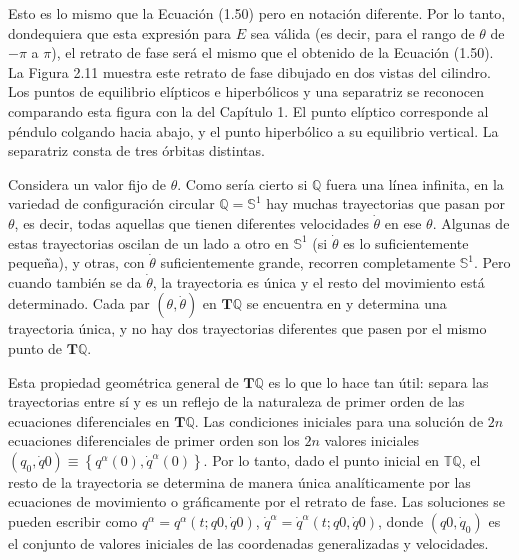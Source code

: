 Esto es lo mismo que la Ecuación (1.50) pero en notación diferente. Por lo tanto, dondequiera que esta expresión para $E$ sea válida (es decir, para el rango de $\theta$ de $-\pi$ a $\pi$), el retrato de fase será el mismo que el obtenido de la Ecuación (1.50). La Figura 2.11 muestra este retrato de fase dibujado en dos vistas del cilindro. Los puntos de equilibrio elípticos e hiperbólicos y una separatriz se reconocen comparando esta figura con la del Capítulo 1. El punto elíptico corresponde al péndulo colgando hacia abajo, y el punto hiperbólico a su equilibrio vertical. La separatriz consta de tres órbitas distintas.

Considera un valor fijo de $\theta$. Como sería cierto si $\mathbb{Q}$ fuera una línea infinita, en la variedad de configuración circular $\mathbb{Q} = \mathbb{S}^{1}$ hay muchas trayectorias que pasan por $\theta$, es decir, todas aquellas que tienen diferentes velocidades $\dot{\theta}$ en ese $\theta$. Algunas de estas trayectorias oscilan de un lado a otro en $\mathbb{S}^{1}$ (si $\dot{\theta}$ es lo suficientemente pequeña), y otras, con $\dot{\theta}$ suficientemente grande, recorren completamente $\mathbb{S}^{1}$. Pero cuando también se da $\dot{\theta}$, la trayectoria es única y el resto del movimiento está determinado. Cada par $(\theta, \dot{\theta})$ en $\mathbf{T} \mathbb{Q}$ se encuentra en y determina una trayectoria única, y no hay dos trayectorias diferentes que pasen por el mismo punto de $\mathbf{T} \mathbb{Q}$.

Esta propiedad geométrica general de $\mathbf{T} \mathbb{Q}$ es lo que lo hace tan útil: separa las trayectorias entre sí y es un reflejo de la naturaleza de primer orden de las ecuaciones diferenciales en $\mathbf{T} \mathbb{Q}$. Las condiciones iniciales para una solución de $2n$ ecuaciones diferenciales de primer orden son los $2n$ valores iniciales $\left(q_{0}, \dot{q}{0}\right) \equiv\left\{q^{\alpha}(0), \dot{q}^{\alpha}(0)\right\}$. Por lo tanto, dado el punto inicial en $\mathbb{T} \mathbb{Q}$, el resto de la trayectoria se determina de manera única analíticamente por las ecuaciones de movimiento o gráficamente por el retrato de fase. Las soluciones se pueden escribir como $q^{\alpha} = q^{\alpha}\left(t ; q{0}, \dot{q}{0}\right)$, $\dot{q}^{\alpha} = \dot{q}^{\alpha}\left(t ; q{0}, \dot{q}{0}\right)$, donde $\left(q{0}, \dot{q}_{0}\right)$ es el conjunto de valores iniciales de las coordenadas generalizadas y velocidades.
